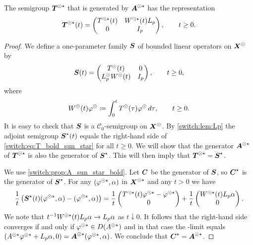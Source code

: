 \begin{proposition}\label{switch:prop:T_bold_sun_star}
  The semigroup $\boldsymbol{T}^{\odot\star}$ that is {\WSTARLY} generated by $\boldsymbol{A}^{\odot\star}$ has the representation
  \begin{equation}\label{switch:eq:T_bold_sun_star}
    \boldsymbol{T}^{\odot\star}(t) =
    \begin{pmatrix}
      T^{\odot\star}(t)& W^{\odot\star}(t)L_p\\
      0& I_p
    \end{pmatrix}, \qquad t \ge 0.
  \end{equation}
\end{proposition}
\begin{proof}
  We define a one-parameter family $\boldsymbol{S}$ of bounded linear operators on $\boldsymbol{X}^{\odot}$ by
  \[
    \boldsymbol{S}(t) =
    \begin{pmatrix}
      T^{\odot}(t)& 0\\
      L_p^{\odot}W^{\odot}(t)& I_p
    \end{pmatrix}, \qquad t \ge 0,
  \]
  where
  \[
    W^{\odot}(t)\varphi^{\odot} \coloneqq \int_0^t{T^{\odot}(\tau)\varphi^{\odot}\,d\tau}, \qquad t \ge 0.
  \]
  It is easy to check that $\boldsymbol{S}$ is a $\mathcal{C}_0$-semigroup on $\boldsymbol{X}^{\odot}$. By \cref{switch:lem:Lp} the adjoint semigroup $\boldsymbol{S}^{\star}(t)$ equals the right-hand side of \cref{switch:eq:T_bold_sun_star} for all $t \ge 0$. We will show that the {\WSTAR} generator $\boldsymbol{A}^{\odot\star}$ of $\boldsymbol{T}^{\odot\star}$ is also the {\WSTAR} generator of $\boldsymbol{S}^{\star}$. This will then imply that $\boldsymbol{T}^{\odot\star} = \boldsymbol{S}^{\star}$.
  \par
We use \cref{switch:prop:A_sun_star_bold}. Let $\boldsymbol{C}$ be the generator of $\boldsymbol{S}$, so $\boldsymbol{C}^{\star}$ is the {\WSTAR} generator of $\boldsymbol{S}^{\star}$. For any $(\varphi^{\odot\star}, \alpha)$ in $\boldsymbol{X}^{\odot\star}$ and any $t > 0$ we have
\[
  \frac{1}{t}\left(\boldsymbol{S}^{\star}(t)(\varphi^{\odot\star}, \alpha) - (\varphi^{\odot\star}, \alpha) \right) = \frac{1}{t}
  \begin{pmatrix}
    T^{\odot\star}(t)\varphi^{\odot\star} - \varphi^{\odot\star}\\
    0
  \end{pmatrix} +
  \frac{1}{t}
  \begin{pmatrix}
    W^{\odot\star}(t)L_p\alpha\\
    0
  \end{pmatrix}.
\]
We note that $t^{-1}W^{\odot\star}(t)L_p\alpha \to L_p\alpha$ {\WSTARLY} as $t \downarrow 0$. It follows that the right-hand side converges {\WSTARLY} if and only if $\varphi^{\odot\star} \in D(A^{\odot\star})$ and in that case the {\WSTAR}-limit equals $(A^{\odot\star}\varphi^{\odot\star} + L_p\alpha, 0) = \boldsymbol{A}^{\odot\star}(\varphi^{\odot\star}, \alpha)$. We conclude that $\boldsymbol{C}^{\star} = \boldsymbol{A}^{\odot\star}$.
\end{proof}

